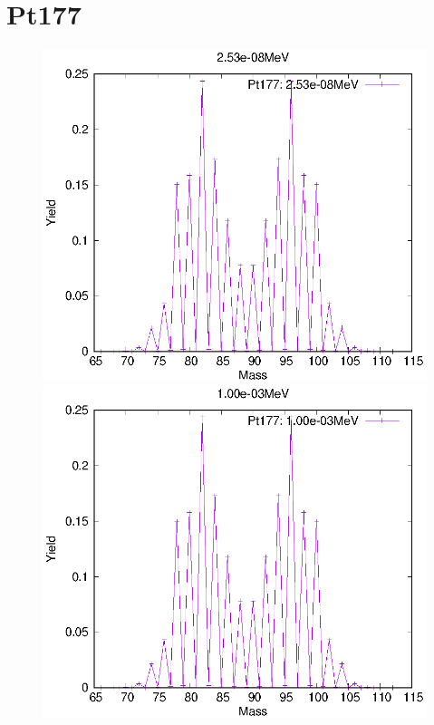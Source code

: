\section{Pt177}
\begin{figure}[htbp]
 \begin{minipage}{0.33\textwidth} \begin{center} \includegraphics[width=\textwidth]{YA/Pt177_2.53e-08.eps} \end{center} \end{minipage}
\begin{minipage}{0.33\textwidth} \begin{center} \includegraphics[width=\textwidth]{YA/Pt177_1.00e-03.eps} \end{center} \end{minipage}

\end{figure}
